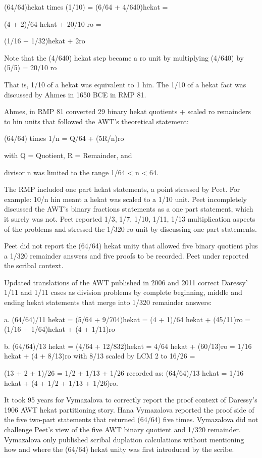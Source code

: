 \documentclass[12pt]{article}
\begin{document}
(64/64)hekat times (1/10) = (6/64 + 4/640)hekat =

(4 + 2)/64 hekat + 20/10 ro =

(1/16 + 1/32)hekat + 2ro

Note that the (4/640) hekat step became a ro unit by multiplying (4/640) by (5/5) = 20/10 ro

That is, 1/10 of a hekat was equivalent to 1 hin. The 1/10 of a hekat fact was discussed by Ahmes in 1650 BCE in RMP 81.

Ahmes, in RMP 81 converted 29 binary hekat quotients + scaled ro remainders to hin units that followed the AWT's theoretical statement:

(64/64) times 1/n = Q/64 + (5R/n)ro

with Q = Quotient, R = Remainder, and

divisor n was limited to the range 1/64 < n < 64. 

The RMP included one part hekat statements, a point stressed by Peet. For example: 10/n hin meant a hekat was scaled to a 1/10 unit. Peet incompletely discussed the AWT's binary fractions statements as a one part statement, which it surely was not. Peet reported 1/3, 1/7, 1/10, 1/11, 1/13 multiplication aspects of the problems and stressed the 1/320 ro unit by discussing one part statements. 

Peet did not report the (64/64) hekat unity that allowed five binary quotient plus a 1/320 remainder answers and five proofs to be recorded. Peet under reported the scribal context. 

Updated translations of the AWT published in 2006 and 2011 correct Daressy' 1/11 and 1/11 cases as division problems by complete beginning, middle and ending hekat statements that merge into 1/320 remainder answers: 

a. (64/64)/11 hekat = (5/64 + 9/704)hekat = (4 + 1)/64 hekat + (45/11)ro = (1/16 + 1/64)hekat + (4 + 1/11)ro 

b. (64/64)/13 hekat = (4/64 + 12/832)hekat = 4/64 hekat + (60/13)ro = 1/16 hekat + (4 + 8/13)ro 
with 8/13 scaled by LCM 2 to 16/26 = 

(13 + 2 + 1)/26 = 1/2 + 1/13 + 1/26 recorded as: (64/64)/13 hekat = 1/16 hekat + (4 + 1/2 + 1/13 + 1/26)ro. 

It took 95 years for Vymazalova to correctly report the proof context of Daressy's 1906 AWT hekat partitioning story. Hana Vymazalova reported the proof side of the five two-part statements that returned (64/64) five times. Vymazalova did not challenge Peet's view of the five AWT binary quotient and 1/320 remainder. Vymazalova only published scribal duplation calculations without mentioning how and where the (64/64) hekat unity was first introduced by the scribe.
\end{document}
